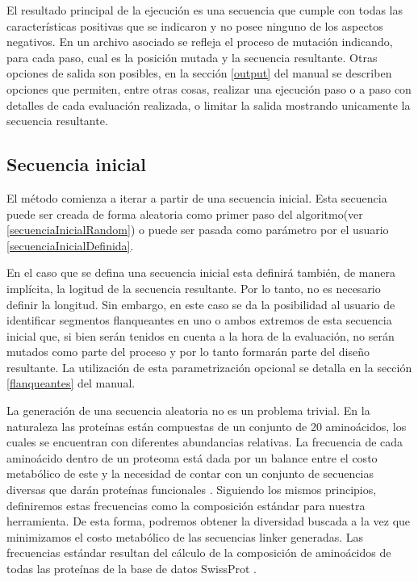 El resultado principal de la ejecución es una secuencia que cumple con todas las características positivas que se indicaron y no posee ninguno de los aspectos negativos.
En un archivo asociado se refleja el proceso de mutación indicando, para cada paso, cual es la posición mutada y la secuencia resultante.
Otras opciones de salida son posibles, en la sección \ref{output} del manual se describen opciones que permiten, entre otras cosas, realizar una ejecución paso o a paso con detalles de cada evaluación realizada, 
o limitar la salida mostrando unicamente la secuencia resultante.

\subsection{Secuencia inicial}\label{seqInicial}

El método comienza a iterar a partir de una secuencia inicial. 
Esta secuencia puede ser creada de forma aleatoria como primer paso del 
algoritmo(ver \ref{secuenciaInicialRandom}) o puede ser pasada como parámetro por el usuario \ref{secuenciaInicialDefinida}. 

En el caso que se defina una secuencia inicial esta definirá también, de manera implícita, la logitud de la secuencia resultante. Por lo tanto, no es necesario definir la longitud.
Sin embargo, en este caso se da la posibilidad al usuario de identificar segmentos flanqueantes en uno o ambos extremos de esta secuencia inicial que, si bien serán tenidos en cuenta a la hora de la evaluación,
no serán mutados como parte del proceso y por lo tanto formarán parte del diseño resultante. 
La utilización de esta parametrización opcional se detalla en la sección \ref{flanqueantes} del manual.

La generación de una secuencia aleatoria no es un problema trivial. 
En la naturaleza las proteínas están compuestas de un conjunto de 20 aminoácidos, los cuales se encuentran con diferentes abundancias relativas. 
La frecuencia de cada aminoácido dentro de un proteoma está dada por un balance entre el costo metabólico de este y la necesidad de contar con un conjunto de secuencias diversas que darán proteínas funcionales \cite{krick2014amino}. 
Siguiendo los mismos principios, definiremos estas frecuencias como la composición estándar para nuestra herramienta. 
De esta forma, podremos obtener la diversidad buscada a la vez que minimizamos el costo metabólico de las secuencias linker generadas.
Las frecuencias estándar resultan del cálculo de la composición de aminoácidos de todas las proteínas de la base de datos SwissProt \cite{compositionAA}.  


